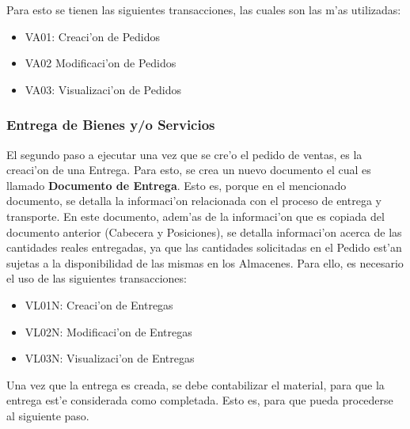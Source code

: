 Para esto se tienen las siguientes transacciones, las cuales son las m'as utilizadas:
\begin{itemize}
\item VA01: Creaci'on de Pedidos
\item VA02 Modificaci'on de Pedidos
\item VA03: Visualizaci'on de Pedidos
\end{itemize}
	
\subsubsection{Entrega de Bienes y/o Servicios}
	El segundo paso a ejecutar una vez que se cre'o el pedido de ventas, es la creaci'on de una  Entrega. Para esto, se crea un nuevo documento el cual es llamado \textbf{Documento de Entrega}. Esto es, porque en el mencionado documento, se detalla la informaci'on relacionada con el proceso de entrega y transporte. En este documento, adem'as de la informaci'on que es copiada del documento anterior (Cabecera y Posiciones), se detalla informaci'on acerca de las cantidades reales entregadas, ya que las cantidades solicitadas en el Pedido est'an sujetas a la disponibilidad de las mismas en los Almacenes. Para ello, es necesario el uso de las siguientes transacciones:
\begin{itemize}
\item VL01N: Creaci'on de Entregas
\item VL02N: Modificaci'on de Entregas
\item VL03N: Visualizaci'on de Entregas
\end{itemize}
	Una vez que la entrega es creada, se debe contabilizar el material, para que la entrega est'e considerada como completada. Esto es, para que pueda procederse al siguiente paso.
	
